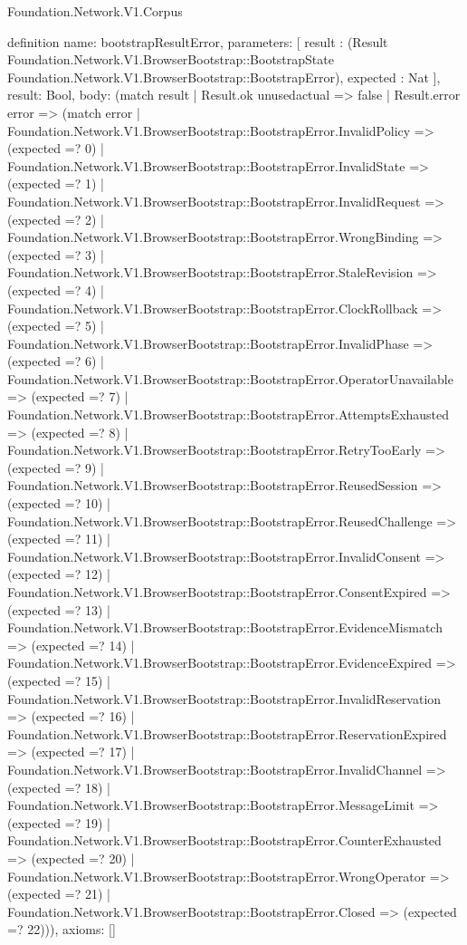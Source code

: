 \begin{lexlean}{Foundation.Network.V1.Corpus}
\begin{semanticmodule}
definition{
  name: bootstrapResultError,
  parameters: [
    result : (Result Foundation.Network.V1.BrowserBootstrap::BootstrapState Foundation.Network.V1.BrowserBootstrap::BootstrapError),
    expected : Nat
  ],
  result: Bool,
  body: (match result
    | Result.ok unusedactual => false
    | Result.error error => (match error
      | Foundation.Network.V1.BrowserBootstrap::BootstrapError.InvalidPolicy => (expected =? 0)
      | Foundation.Network.V1.BrowserBootstrap::BootstrapError.InvalidState => (expected =? 1)
      | Foundation.Network.V1.BrowserBootstrap::BootstrapError.InvalidRequest => (expected =? 2)
      | Foundation.Network.V1.BrowserBootstrap::BootstrapError.WrongBinding => (expected =? 3)
      | Foundation.Network.V1.BrowserBootstrap::BootstrapError.StaleRevision => (expected =? 4)
      | Foundation.Network.V1.BrowserBootstrap::BootstrapError.ClockRollback => (expected =? 5)
      | Foundation.Network.V1.BrowserBootstrap::BootstrapError.InvalidPhase => (expected =? 6)
      | Foundation.Network.V1.BrowserBootstrap::BootstrapError.OperatorUnavailable => (expected =? 7)
      | Foundation.Network.V1.BrowserBootstrap::BootstrapError.AttemptsExhausted => (expected =? 8)
      | Foundation.Network.V1.BrowserBootstrap::BootstrapError.RetryTooEarly => (expected =? 9)
      | Foundation.Network.V1.BrowserBootstrap::BootstrapError.ReusedSession => (expected =? 10)
      | Foundation.Network.V1.BrowserBootstrap::BootstrapError.ReusedChallenge => (expected =? 11)
      | Foundation.Network.V1.BrowserBootstrap::BootstrapError.InvalidConsent => (expected =? 12)
      | Foundation.Network.V1.BrowserBootstrap::BootstrapError.ConsentExpired => (expected =? 13)
      | Foundation.Network.V1.BrowserBootstrap::BootstrapError.EvidenceMismatch => (expected =? 14)
      | Foundation.Network.V1.BrowserBootstrap::BootstrapError.EvidenceExpired => (expected =? 15)
      | Foundation.Network.V1.BrowserBootstrap::BootstrapError.InvalidReservation => (expected =? 16)
      | Foundation.Network.V1.BrowserBootstrap::BootstrapError.ReservationExpired => (expected =? 17)
      | Foundation.Network.V1.BrowserBootstrap::BootstrapError.InvalidChannel => (expected =? 18)
      | Foundation.Network.V1.BrowserBootstrap::BootstrapError.MessageLimit => (expected =? 19)
      | Foundation.Network.V1.BrowserBootstrap::BootstrapError.CounterExhausted => (expected =? 20)
      | Foundation.Network.V1.BrowserBootstrap::BootstrapError.WrongOperator => (expected =? 21)
      | Foundation.Network.V1.BrowserBootstrap::BootstrapError.Closed => (expected =? 22))),
  axioms: []
}


\end{semanticmodule}
\end{lexlean}
